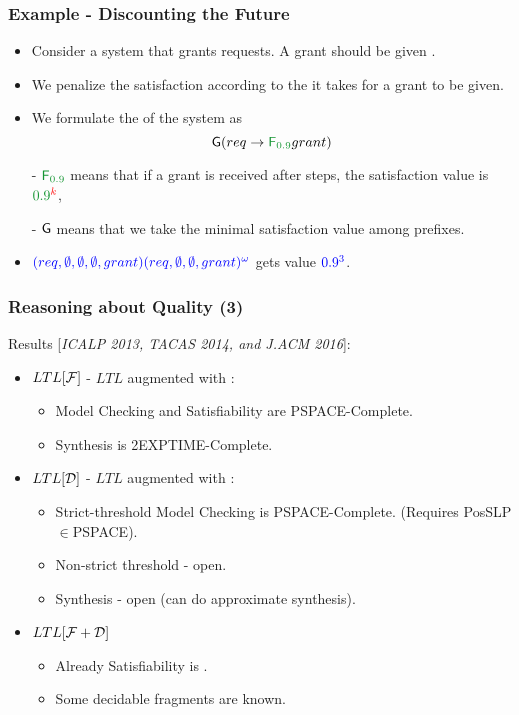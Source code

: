 \begin{frame}
	\frametitle{Example - Discounting the Future}
	\begin{itemize}[<+->]
		\item Consider a system that grants requests. A grant should be given .
		\item We penalize the satisfaction  according to the  it takes for a grant to be given.
		\item We formulate the  of the system as
		$$\Alw(req\to \emc{darkgreen}{\Ev_{0.9}} grant)$$
		\item[-] $\emc{darkgreen}{\Ev_{0.9}}$ means that if a grant is received after  steps, the satisfaction value is $\emc{darkgreen}{0.9}^{\emc{red}{k}}$,\\
		\item[-] $\Alw$ means that we take the minimal satisfaction value among prefixes.
		\item $\emc{blue}{(req,\emptyset,\emptyset,\emptyset,grant)(req,\emptyset,\emptyset,grant)^\omega}$ gets value $\emc{blue}{0.9^3}$. 
	\end{itemize}
\end{frame}

\begin{frame}
	\frametitle{Reasoning about Quality (3)}
	Results [\emph{ICALP 2013, TACAS 2014, and J.ACM 2016}]:
	\begin{itemize}[<+->]
		\item $LTL[{\cal F}]$ - $LTL$ augmented with :
			\begin{itemize}
				\item Model Checking and Satisfiability are PSPACE-Complete.
				\item Synthesis is 2EXPTIME-Complete.
			\end{itemize}
		\item $LTL[{\cal D}]$ - $LTL$ augmented with :
			\begin{itemize}
				\item Strict-threshold Model Checking is PSPACE-Complete. (Requires PosSLP$\in$PSPACE).
				\item Non-strict threshold - open.
				\item Synthesis - open (can do approximate synthesis).
			\end{itemize}		
		\item $LTL[{\cal F+D}]$
		\begin{itemize}
			\item Already Satisfiability is .
			\item Some decidable fragments are known.
		\end{itemize}
	\end{itemize}
\end{frame}